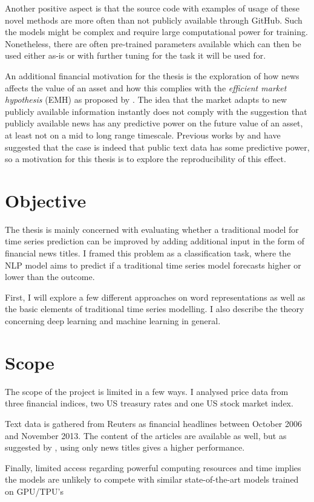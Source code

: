 Another positive aspect is that the source code with examples of usage of these novel methods are more often than not publicly available through GitHub. Such the models might be complex and require large computational power for training. Nonetheless, there are often pre-trained parameters available which can then be used either as-is or with further tuning for the task it will be used for. 

An additional financial motivation for the thesis is the exploration of how news affects the value of an asset and how this complies with the \emph{efficient market hypothesis} (EMH) as proposed by \citet{malkiel1970efficient}. The idea that the market adapts to new publicly available information instantly does not comply with the suggestion that publicly available news has any predictive power on the future value of an asset, at least not on a mid to long range timescale. Previous works by  \citet{xing} and \citet{arorausing} have suggested that the case is indeed that public text data has some predictive power, so a motivation for this thesis is to explore the reproducibility of this effect.

\section{Objective}

The thesis is mainly concerned with evaluating whether a traditional model for time series prediction can be improved by adding additional input in the form of financial news titles.
I framed this problem as a classification task, where the NLP model aims to predict if a traditional time series model forecasts higher or lower than the outcome.

First, I will explore a few different approaches on word representations as well as the basic elements of traditional time series modelling. I also describe the theory concerning deep learning and machine learning in general. 



\section{Scope}

The scope of the project is limited in a few ways. I analysed price data from three financial indices, two US treasury rates and one US stock market index. 

Text data is gathered from Reuters as financial headlines between October 2006 and November 2013. The content of the articles are available as well, but as suggested by \citet{ding2014using}, using only news titles gives a higher performance. 

Finally, limited access regarding powerful computing resources and time implies the models are unlikely to compete with similar state-of-the-art models trained on GPU/TPU's 


